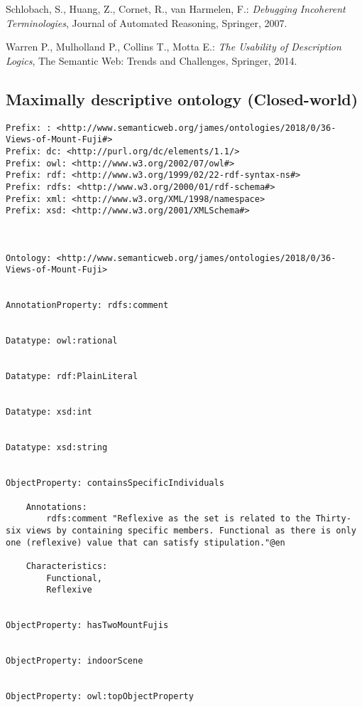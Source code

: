 \documentclass[titlepage,a4paper,12pt,oneside]{book}
\begin{document}
\begin{thebibliography}{99}
  Schlobach, S., Huang, Z., Cornet, R., van Harmelen, F.: 
  \textit{Debugging Incoherent Terminologies},
  Journal of Automated Reasoning,
  Springer,
  2007.

  Warren P., Mulholland P., Collins T., Motta E.:
  \textit{The Usability of Description Logics},
  The Semantic Web: Trends and Challenges,
  Springer,
  2014.

\end{thebibliography}

\begin{appendices}
\chapter{Maximally descriptive ontology (Closed-world)}
\begin{lstlisting}
Prefix: : <http://www.semanticweb.org/james/ontologies/2018/0/36-Views-of-Mount-Fuji#>
Prefix: dc: <http://purl.org/dc/elements/1.1/>
Prefix: owl: <http://www.w3.org/2002/07/owl#>
Prefix: rdf: <http://www.w3.org/1999/02/22-rdf-syntax-ns#>
Prefix: rdfs: <http://www.w3.org/2000/01/rdf-schema#>
Prefix: xml: <http://www.w3.org/XML/1998/namespace>
Prefix: xsd: <http://www.w3.org/2001/XMLSchema#>



Ontology: <http://www.semanticweb.org/james/ontologies/2018/0/36-Views-of-Mount-Fuji>


AnnotationProperty: rdfs:comment

    
Datatype: owl:rational

    
Datatype: rdf:PlainLiteral

    
Datatype: xsd:int

    
Datatype: xsd:string

    
ObjectProperty: containsSpecificIndividuals

    Annotations: 
        rdfs:comment "Reflexive as the set is related to the Thirty-six views by containing specific members. Functional as there is only one (reflexive) value that can satisfy stipulation."@en
    
    Characteristics: 
        Functional,
        Reflexive
    
    
ObjectProperty: hasTwoMountFujis

    
ObjectProperty: indoorScene

    
ObjectProperty: owl:topObjectProperty


\end{lstlisting}
\end{appendices}
\end{document}
